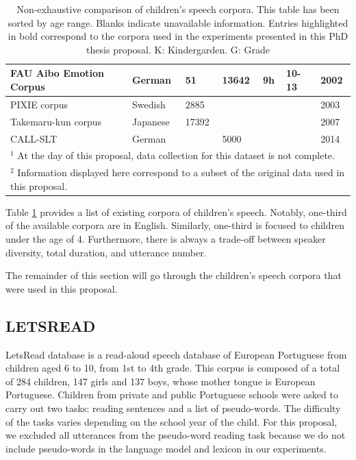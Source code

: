 \begin{table}
\begin{tabular}{|l|l|l|l|l|l|l|}
\hline
FAU Aibo Emotion Corpus \cite{steidl2009automatic} & German & 51 & 13642 & 9h & 10-13 & 2002 \\ 
\hline
PIXIE corpus \cite{bell2003child} & Swedish & 2885 &  &  &  & 2003 \\ 
\hline
Takemaru-kun corpus \cite{takemaru} & Japanese & 17392 &  &  & & 2007 \\ 
\hline
CALL-SLT \cite{callslt} & German &  & 5000 &  &  & 2014 \\ 
\hline
\multicolumn{7}{l}{$^1$ At the day of this proposal, data collection for this dataset is not complete.} \\
\multicolumn{7}{l}{$^2$ Information displayed here correspond to a subset of the original data used in this proposal.}  \\
\end{tabular}
\caption{Non-exhaustive comparison of children's speech corpora. This table has been sorted by age range. Blanks indicate unavailable information. Entries highlighted in bold correspond to the corpora used in the experiments presented in this PhD thesis proposal. K: Kindergarden. G: Grade}
\label{table:children_corpora}
\end{table}
Table \ref{table:children_corpora} provides a list of existing corpora of children's speech. Notably, one-third of the available corpora are in English. Similarly, one-third is focused to children under the age of 4. Furthermore, there is always a trade-off between speaker diversity, total duration, and utterance number.

The remainder of this section will go through the children's speech corpora that were used in this proposal.

\subsection{LETSREAD}
LetsRead database \cite{letsread} is a read-aloud speech database of European Portuguese from children aged 6 to 10,  from 1st to 4th grade. This corpus is composed of a total of 284 children, 147 girls and 137 boys, whose mother tongue is European Portuguese. Children from private and public Portuguese schools were asked to carry out two tasks: reading sentences and a list of pseudo-words. The difficulty of the tasks varies depending on the school year of the child. 
For this proposal, we excluded all utterances from the pseudo-word reading task because we do not include pseudo-words in the language model and lexicon in our experiments. 
